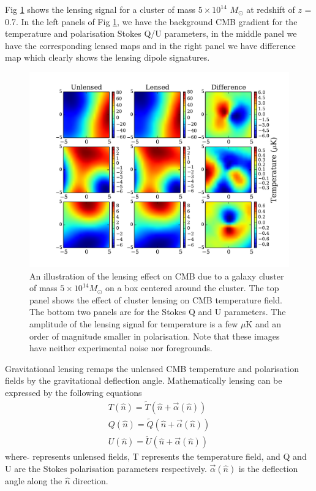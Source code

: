 Fig \ref{fig:lensing_signal} shows the lensing signal for a cluster of mass $5 \times 10^{14}$ $M_{\odot}$ at redshift of $z$ = 0.7.
In  the left panels of Fig \ref{fig:lensing_signal}, we have the background CMB gradient for the temperature and polarisation Stokes Q/U parameters, in the middle panel we have the corresponding lensed maps and in the right panel we have difference map which clearly shows the lensing dipole signatures.
\begin{figure}[ht]
\begin{center}
\includegraphics[width=\linewidth, keepaspectratio]{figs/lensing_signal.pdf}
 \caption{An illustration of the lensing effect on CMB due to a galaxy cluster of mass $5\times 10^{14} M_{\odot}$ on a \smallboxsize \; box centered around the cluster.
  The top panel shows the effect of cluster lensing on CMB temperature field.
  The bottom two panels are for the Stokes Q and U parameters.
  The amplitude of the lensing signal for temperature is a few $\mu$K and an order of magnitude smaller in polarisation.
  Note that these images have neither experimental noise nor foregrounds.
 } 
\label{fig:lensing_signal}
\end{center}
\end{figure}

Gravitational lensing remaps the unlensed CMB temperature and polarisation fields by the gravitational deflection angle. Mathematically lensing can be expressed by the following equations
\begin{eqnarray}
T(\hat{n}) = \widetilde{T}(\hat{n} + \vec{\alpha}(\hat{n}))\\
Q(\hat{n}) = \widetilde{Q}(\hat{n} + \vec{\alpha}(\hat{n}))\\
U(\hat{n}) =  \widetilde{U}(\hat{n} + \vec{\alpha}(\hat{n}))
\end{eqnarray}
where $\widetilde{}$ represents unlensed fields, T represents the temperature field, and Q and U are the Stokes polarisation parameters respectively. 
$\vec{\alpha}(\hat{n})$ is the deflection angle along the $\hat{n}$ direction. 
\\

